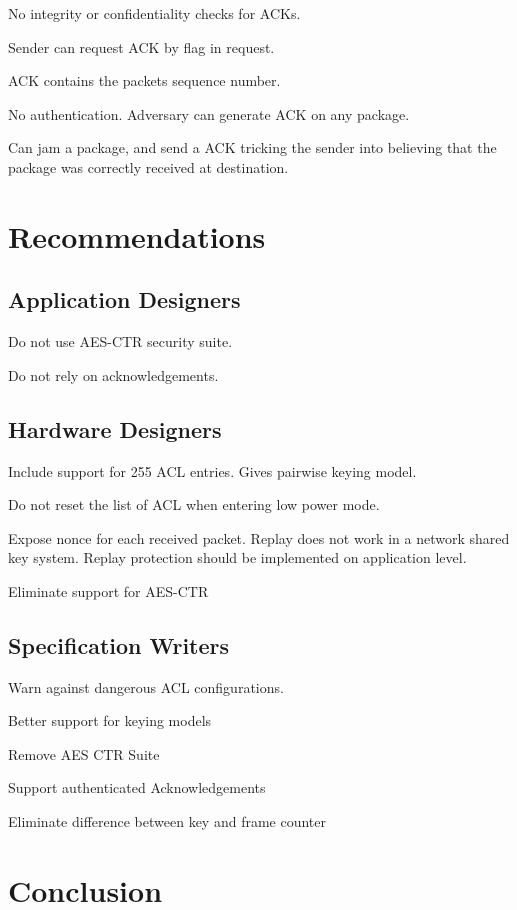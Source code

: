 \documentclass[10pt]{article}
\begin{document}
No integrity or confidentiality checks for ACKs.

Sender can request ACK by flag in request.

ACK contains the packets sequence number.

No authentication. Adversary can generate ACK on any package.

Can jam a package, and send a ACK tricking the sender into believing that the package was correctly received at destination.

\section{Recommendations}

\subsection{Application Designers}

Do not use AES-CTR security suite.

Do not rely on acknowledgements.

\subsection{Hardware Designers}

Include support for 255 ACL entries. Gives pairwise keying model.

Do not reset the list of ACL when entering low power mode.

Expose nonce for each received packet. Replay does not work in a network shared key system. Replay protection should be implemented on application level.

Eliminate support for AES-CTR

\subsection{Specification Writers}

Warn against dangerous ACL configurations.

Better support for keying models

Remove AES CTR Suite

Support authenticated Acknowledgements

Eliminate difference between key and frame counter

\section{Conclusion}
\end{document}
